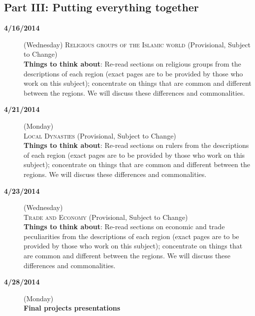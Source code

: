 \documentclass{tufte-handout} %
\begin{document}
\subsection{Part III: Putting everything together}
\begin{description}

\item[\textbf{4/16/2014}] (Wednesday)
\textsc{Religious groups of the Islamic world} (Provisional, Subject to Change)\\
\textbf{Things to think about}: Re-read sections on religious groups from the descriptions of each region (exact pages are to be provided by those who work on this subject); concentrate on things that are common and different between the regions. We will discuss these differences and commonalities.

\noindent\hrulefill

\item[\textbf{4/21/2014}] (Monday)\\
\textsc{Local Dynasties} (Provisional, Subject to Change)\\
\textbf{Things to think about}: Re-read sections on rulers from the descriptions of each region (exact pages are to be provided by those who work on this subject); concentrate on things that are common and different between the regions. We will discuss these differences and commonalities.

\item[\textbf{4/23/2014}] (Wednesday)\\
\textsc{Trade and Economy }(Provisional, Subject to Change)\\
\textbf{Things to think about}: Re-read sections on economic and trade peculiarities from the descriptions of each region (exact pages are to be provided by those who work on this subject); concentrate on things that are common and different between the regions. We will discuss these differences and commonalities.

\noindent\hrulefill

\item[\textbf{4/28/2014}] (Monday)\\
\textbf{Final projects presentations}

\end{description}
\end{document}
